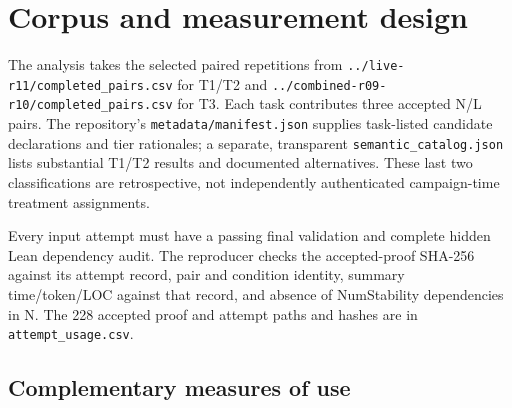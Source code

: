 \documentclass[10pt]{article}
\newcommand{\sourcepath}[1]{\nolinkurl{#1}}
\begin{document}
\clearpage
\section{Corpus and measurement design}

The analysis takes the selected paired repetitions from \sourcepath{../live-r11/completed_pairs.csv} for T1/T2 and \sourcepath{../combined-r09-r10/completed_pairs.csv} for T3. Each task contributes three accepted N/L pairs. The repository's \sourcepath{metadata/manifest.json} supplies task-listed candidate declarations and tier rationales; a separate, transparent \sourcepath{semantic_catalog.json} lists substantial T1/T2 results and documented alternatives. These last two classifications are retrospective, not independently authenticated campaign-time treatment assignments.

Every input attempt must have a passing final validation and complete hidden Lean dependency audit. The reproducer checks the accepted-proof SHA-256 against its attempt record, pair and condition identity, summary time/token/LOC against that record, and absence of NumStability dependencies in N. The 228 accepted proof and attempt paths and hashes are in \sourcepath{attempt_usage.csv}.

\subsection*{Complementary measures of use}
\end{document}
